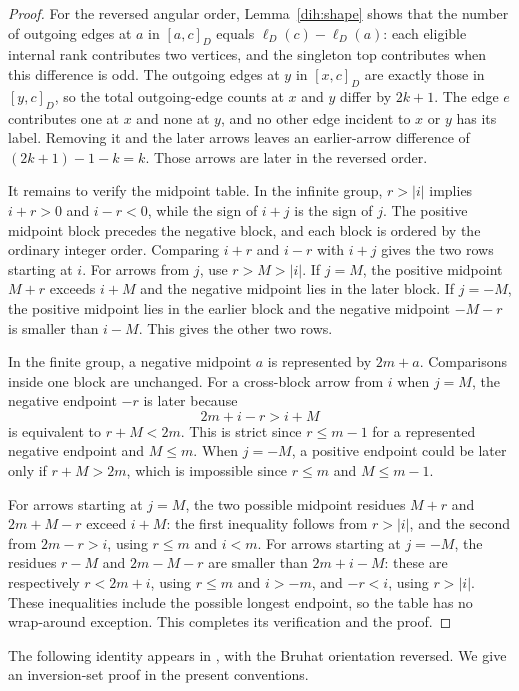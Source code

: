\begin{proof}
For the reversed angular order, Lemma~\ref{dih:shape} shows that the
number of outgoing edges at $a$ in $[a,c]_D$ equals
$\ell_D(c)-\ell_D(a)$: each eligible internal rank contributes two
vertices, and the singleton top contributes when this difference is odd.
The outgoing edges at $y$ in $[x,c]_D$ are exactly those in $[y,c]_D$,
so the total outgoing-edge counts at $x$ and $y$ differ by $2k+1$.
The edge $e$ contributes one at $x$ and none at $y$, and no other edge
incident to $x$ or $y$ has its label.  Removing it and the later arrows leaves an
earlier-arrow difference of $(2k+1)-1-k=k$.  Those arrows are later in
the reversed order.

It remains to verify the midpoint table.  In the infinite group,
$r>|i|$ implies $i+r>0$ and $i-r<0$, while the sign of $i+j$ is the sign
of $j$.  The positive midpoint block precedes the negative block, and
each block is ordered by the ordinary integer order.  Comparing $i+r$
and $i-r$ with $i+j$ gives the two rows starting at $i$.  For arrows from
$j$, use $r>M>|i|$.  If $j=M$, the positive midpoint $M+r$ exceeds $i+M$
and the negative midpoint lies in the later block.  If $j=-M$, the positive
midpoint lies in the earlier block and the negative midpoint $-M-r$ is
smaller than $i-M$.  This gives the other two rows.

In the finite group, a negative midpoint $a$ is represented by $2m+a$.
Comparisons inside one block are unchanged.  For a cross-block arrow from
$i$ when $j=M$, the negative endpoint $-r$ is later because
\[
 2m+i-r>i+M
\]
is equivalent to $r+M<2m$.  This is strict since $r\le m-1$ for a
represented negative endpoint and $M\le m$.  When $j=-M$, a positive
endpoint could be later only if $r+M>2m$, which is impossible since
$r\le m$ and $M\le m-1$.

For arrows starting at $j=M$, the two possible midpoint residues
$M+r$ and $2m+M-r$ exceed $i+M$: the first inequality follows from
$r>|i|$, and the second from $2m-r>i$, using $r\le m$ and $i<m$.
For arrows starting at $j=-M$, the residues $r-M$ and $2m-M-r$ are
smaller than $2m+i-M$: these are respectively $r<2m+i$, using $r\le m$
and $i>-m$, and $-r<i$, using $r>|i|$.  These inequalities include the
possible longest endpoint, so the table has no wrap-around exception.
This completes its verification and the proof.
\end{proof}

The following identity appears in \cite[equation~(1.11.2)]{DyerRankTwo},
with the Bruhat orientation reversed.  We give an inversion-set proof in
the present conventions.

